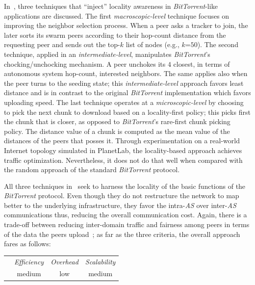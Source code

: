 In~\textbf{\cite{LCLX2009}}, three techniques that 
``inject'' locality awareness in \emph{BitTorrent}-like applications are discussed.
The first \emph{macroscopic-level} technique
focuses on improving the neighbor selection process. 
When a peer asks a tracker to join, 
the later sorts its swarm peers according to
their hop-count distance from the requesting peer and 
sends out the top-$k$ list of nodes (e.g., $k$=$50$).
The second technique, applied in an \emph{intermediate-level}, manipulates
\emph{BitTorrent}'s chocking/unchocking mechanism. A peer unchokes its $4$
closest, in terms of 
autonomous system hop-count, interested neighbors. 
The same applies also when the peer turns to 
the seeding state;  this  \emph{intermediate-level} approach favors
least distance and is in contrast to the original \emph{BitTorrent} 
implementation which favors uploading speed.
The last technique operates at a \emph{microscopic-level} by choosing to pick
the next chunk to download based on a locality-first policy; this picks first
the chunk that is closer, as opposed to \emph{BitTorrent}'s rare-first chunk
picking policy.
The distance value of a chunk is computed as the mean
value of the distances of the peers that posses it.
Through experimentation on a real-world Internet topology simulated in
{\sf PlanetLab}, the locality-based approach achieves traffic optimization.
Nevertheless, it does not do that well when compared with the
random approach of the standard \emph{BitTorrent} protocol.

All three techniques in~\cite{LCLX2009} seek to harness 
the locality of the basic functions of the
\emph{BitTorrent} protocol. 
Even though they do not restructure the network to map
better to the underlying infrastructure, they favor the intra-\emph{AS} 
over inter-\emph{AS} communications thus, reducing the overall communication cost.
Again, there is a trade-off between reducing inter-domain
traffic and fairness among peers in terms of the data the peers upload~\cite{LCLX2009};
as far as the three criteria, the overall approach fares as follows:
\begin{center}
{\footnotesize
\begin{tabular}{rccc}
\multicolumn{1}{r}{} &
\multicolumn{1}{c}{\emph{Efficiency}} &
\multicolumn{1}{c}{\emph{Overhead}} &
\multicolumn{1}{c}{\emph{Scalability}}
\\
\cline{2-4}
\emph{\cite{LCLX2009}} &
medium &
low &
medium
\end{tabular}
}
\end{center}

